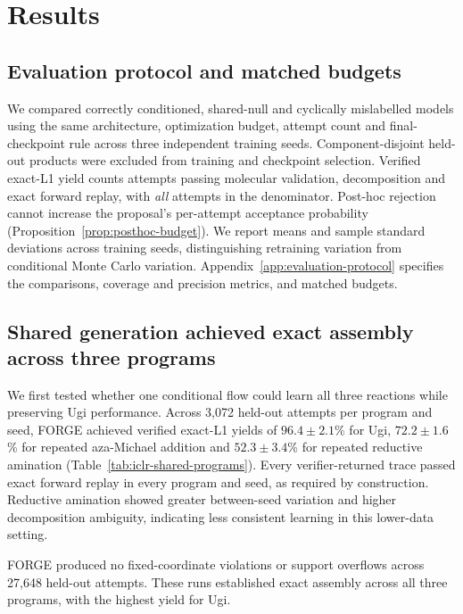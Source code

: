 \documentclass{article}
\theoremstyle{definition}
\newcommand{\ForgeTableOneConditionedBLYield}{$72.2\pm1.6$}
\newcommand{\ForgeTableOneConditionedLXYield}{$52.3\pm3.4$}
\newcommand{\ForgeTableOneConditionedUgiYield}{$96.4\pm2.1$}
\newcommand{\ForgeProseAttemptsPerProgram}{3{,}072}
\newcommand{\ForgeProseConditionedTotalAttempts}{27{,}648}
\begin{document}
\section{Results}
\label{sec:results}

\subsection{Evaluation protocol and matched budgets}
We compared correctly conditioned, shared-null and cyclically mislabelled models using the same
architecture, optimization budget, attempt count and final-checkpoint rule across three independent
training seeds. Component-disjoint held-out products were excluded from training and checkpoint
selection. Verified exact-L1 yield counts attempts passing molecular validation, decomposition and
exact forward replay, with \emph{all} attempts in the denominator. Post-hoc rejection cannot increase
the proposal's per-attempt acceptance probability (Proposition~\ref{prop:posthoc-budget}). We report
means and sample standard deviations across training seeds, distinguishing retraining variation from
conditional Monte Carlo variation. Appendix~\ref{app:evaluation-protocol} specifies the comparisons,
coverage and precision metrics, and matched budgets.

\subsection{Shared generation achieved exact assembly across three programs}
We first tested whether one conditional flow could learn all three reactions while preserving Ugi
performance. Across
\ForgeProseAttemptsPerProgram{} held-out attempts per program and seed, FORGE achieved verified
exact-L1 yields of \ForgeTableOneConditionedUgiYield\% for Ugi,
\ForgeTableOneConditionedBLYield\% for repeated aza-Michael addition and
\ForgeTableOneConditionedLXYield\% for repeated reductive amination
(Table~\ref{tab:iclr-shared-programs}). Every verifier-returned trace passed exact forward replay in
every program and seed, as required by construction. Reductive amination showed greater between-seed
variation and higher decomposition ambiguity, indicating less consistent learning in this lower-data
setting.

FORGE produced no fixed-coordinate violations or support overflows across
\ForgeProseConditionedTotalAttempts{} held-out attempts. These runs established exact assembly across
all three programs, with the highest yield for Ugi.
\end{document}
